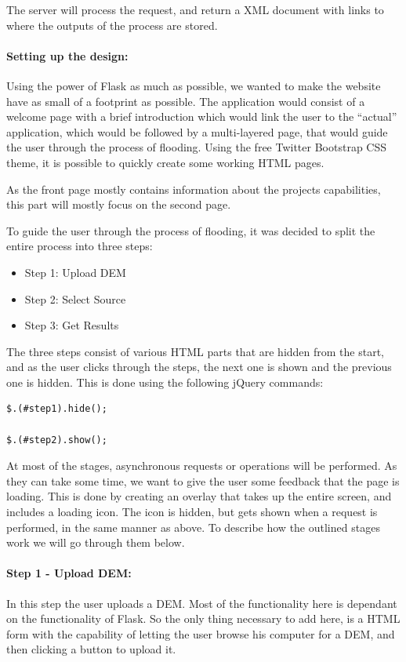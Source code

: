 The server will process the request, and return a XML document with links to where the outputs of the process are stored. 

\paragraph{Setting up the design:} Using the power of Flask as much as possible, we wanted to make the website have as small of a footprint as possible. 
The application would consist of a welcome page with a brief introduction which would link the user to the “actual” application, which would be followed by a multi-layered page, that would guide the user through the process of flooding. 
Using the free Twitter Bootstrap CSS theme, it is possible to quickly create some working HTML pages. 

As the front page mostly contains information about the projects capabilities, this part will mostly focus on the second page. 

To guide the user through the process of flooding, it was decided to split the entire process into three steps:
\begin{itemize}
\item Step 1: Upload DEM
\item Step 2: Select Source
\item Step 3: Get Results
\end{itemize}
The three steps consist of various HTML parts that are hidden from the start, and as the user clicks through the steps, the next one is shown and the previous one is hidden. This is done using the following jQuery commands:

\begin{lstlisting}
$.(#step1).hide();

$.(#step2).show();
\end{lstlisting}

At most of the stages, asynchronous requests or operations will be performed. As they can take some time, we want to give the user some feedback that the page is loading. This is done by creating an overlay that takes up the entire screen, and includes a loading icon. The icon is hidden, but gets shown when a request is performed, in the same manner as above.
To describe how the outlined stages work we will go through them below. \\

\paragraph{Step 1 - Upload DEM:}
In this step the user uploads a DEM. Most of the functionality here is dependant on the functionality of Flask. So the only thing necessary to add here, is a HTML form with the capability of letting the user browse his computer for a DEM, and then clicking a button to upload it. \\

